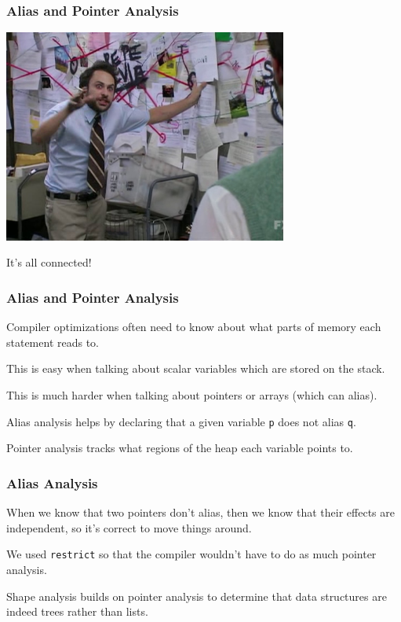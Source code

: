 \begin{frame}
\frametitle{Alias and Pointer Analysis}

\begin{center}
	\includegraphics[width=0.7\textwidth]{images/redstring.jpg}
\end{center}

It's all connected!

\end{frame}


\begin{frame}
\frametitle{Alias and Pointer Analysis}

Compiler optimizations often need
to know about what parts of memory each statement reads to.  

This is
easy when talking about scalar variables which are stored on the
stack. 

This is much harder when talking about pointers or arrays
(which can alias). 

\alert{Alias analysis} helps by declaring that a
given variable {\tt p} does not alias {\tt q}.

\alert{Pointer analysis} tracks what regions of the heap each variable points to.

\end{frame}

\begin{frame}
\frametitle{Alias Analysis}

When we know that two pointers don't alias, then we know that their
effects are independent, so it's correct to move things around.

We used {\tt restrict} so that the
compiler wouldn't have to do as much pointer analysis. 

Shape analysis
builds on pointer analysis to determine that data structures are indeed
trees rather than lists.


\end{frame}

